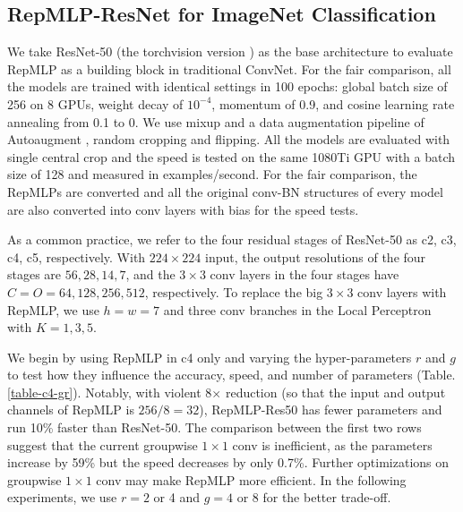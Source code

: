 \documentclass[10pt,twocolumn,letterpaper]{article}
\begin{document}
\subsection{RepMLP-ResNet for ImageNet Classification}



We take ResNet-50 \cite{he2016deep} (the torchvision version \cite{torch-model}) as the base architecture to evaluate RepMLP as a building block in traditional ConvNet. For the fair comparison, all the models are trained with identical settings in 100 epochs: global batch size of 256 on 8 GPUs, weight decay of $10^{-4}$, momentum of 0.9, and cosine learning rate annealing from 0.1 to 0. We use mixup \cite{zhang2017mixup} and a data augmentation pipeline of Autoaugment \cite{cubuk2019autoaugment}, random cropping and flipping. All the models are evaluated with single central crop and the speed is tested on the same 1080Ti GPU with a batch size of 128 and measured in examples/second. For the fair comparison, the RepMLPs are converted and all the original conv-BN structures of every model are also converted into conv layers with bias for the speed tests. 

As a common practice, we refer to the four residual stages of ResNet-50 as c2, c3, c4, c5, respectively. With $224\times224$ input, the output resolutions of the four stages are $56, 28, 14, 7$, and the $3\times3$ conv layers in the four stages have $C=O=64,128,256,512$, respectively. To replace the big $3\times3$ conv layers with RepMLP, we use $h=w=7$ and three conv branches in the Local Perceptron with $K=1,3,5$. 

We begin by using RepMLP in c4 only and varying the hyper-parameters $r$ and $g$ to test how they influence the accuracy, speed, and number of parameters (Table. \ref{table-c4-gr}). Notably, with violent 8$\times$ reduction (so that the input and output channels of RepMLP is $256/8=32$), RepMLP-Res50 has fewer parameters and run 10\% faster than ResNet-50. The comparison between the first two rows suggest that the current groupwise $1\times1$ conv is inefficient, as the parameters increase by 59\% but the speed decreases by only 0.7\%. Further optimizations on groupwise $1\times1$ conv may make RepMLP more efficient. In the following experiments, we use $r=2$ or 4 and $g=4$ or 8 for the better trade-off.
\end{document}
